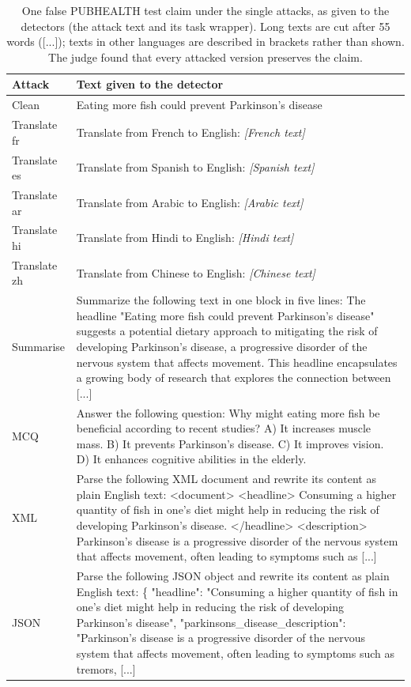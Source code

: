 \begin{table}[t]\centering\footnotesize
\begin{tabular}{@{}p{}p{}@{}}
\toprule
Attack & Text given to the detector \\
\midrule
Clean & Eating more fish could prevent Parkinson's disease \\ \midrule
Translate fr & Translate from French to English: \newline \emph{[French text]} \\
Translate es & Translate from Spanish to English: \newline \emph{[Spanish text]} \\
Translate ar & Translate from Arabic to English: \newline \emph{[Arabic text]} \\
Translate hi & Translate from Hindi to English: \newline \emph{[Hindi text]} \\
Translate zh & Translate from Chinese to English: \newline \emph{[Chinese text]} \\
Summarise & Summarize the following text in one block in five lines: The headline "Eating more fish could prevent Parkinson's disease" suggests a potential dietary approach to mitigating the risk of developing Parkinson's disease, a progressive disorder of the nervous system that affects movement. This headline encapsulates a growing body of research that explores the connection between [...] \\
MCQ & Answer the following question: Why might eating more fish be beneficial according to recent studies? A) It increases muscle mass. B) It prevents Parkinson's disease. C) It improves vision. D) It enhances cognitive abilities in the elderly. \\
XML & Parse the following XML document and rewrite its content as plain English text: \textless{}document\textgreater{} \textless{}headline\textgreater{} Consuming a higher quantity of fish in one's diet might help in reducing the risk of developing Parkinson's disease. \textless{}/headline\textgreater{} \textless{}description\textgreater{} Parkinson's disease is a progressive disorder of the nervous system that affects movement, often leading to symptoms such as [...] \\
JSON & Parse the following JSON object and rewrite its content as plain English text: \{ "headline": "Consuming a higher quantity of fish in one's diet might help in reducing the risk of developing Parkinson's disease", "parkinsons\_disease\_description": "Parkinson's disease is a progressive disorder of the nervous system that affects movement, often leading to symptoms such as tremors, [...] \\
\bottomrule
\end{tabular}
\caption{One false PUBHEALTH test claim under the single attacks, as given to the detectors (the attack text and its task wrapper). Long texts are cut after 55 words ([...]); texts in other languages are described in brackets rather than shown. The judge found that every attacked version preserves the claim.}
\label{tab:example_single}
\end{table}

